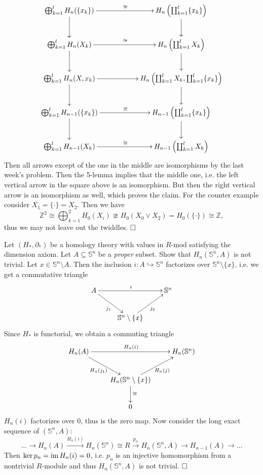 \documentclass[11pt]{book}
\numberwithin{dummy}{section}
\theoremstyle{nonumberbreak}
\newenvironment{sol}[1][]{\ifthenelse{\equal{#1}{}}{\solution}{\solution[#1]}\rm}{\endsolution}
\newenvironment{prob}[1][]{\ifthenelse{\equal{#1}{}}{\problem}{\problem[#1]}\rm}{\endproblem}
\newcommand{\Rmod}{\underline{R\textrm{-}\mathrm{mod}}}
\newcommand{\im}{\mathrm{im} \hspace{1.5pt}}
\newcommand{\Sph}{\mathbb{S}}
\newcommand{\la}{\longrightarrow}
\newcommand{\Z}{\mathbb{Z}}
\begin{document}
\begin{spacing}{1.4}
\begin{prob}
\begin{sol}
$$
\begin{xy}
\xymatrix{
\bigoplus_{k=1}^l H_n(\{x_k\}) \ar[rr]^{\cong} \ar[d] && H_n\left( \coprod_{k=1}^l \{x_k\}\right) \ar[d] \\
\bigoplus_{k=1}^l H_n(X_k) \ar[d] \ar[rr]^{\cong} && H_n\left( \coprod_{k=1}^l X_k\right) \ar[d] \\
\bigoplus_{k=1}^l H_n(X,x_k) \ar[d] \ar[rr] && H_n\left( \coprod_{k=1}^l X_k, \coprod_{k=1}^l \{x_k\}\right) \ar[d] \\
\bigoplus_{k=1}^l H_{n-1}(\{x_k\}) \ar[d] \ar[rr]^{\cong} && H_{n-1}\left( \coprod_{k=1}^l \{x_k\}\right) \ar[d] \\
\bigoplus_{k=1}^l H_{n-1}(X_k) \ar[rr]^{\cong} && H_{n-1}\left( \coprod_{k=1}^l X_k\right)
}
\end{xy}
$$
Then all arrows except of the one in the middle are isomorphisms by the last week's problem. Then the 5-lemma implies that the middle one, i.e. the left vertical arrow in the square above is an isomorphism. But then the right vertical arrow is an isomorphism as well, which proves the claim. For the counter example consider $X_1=\{\cdot\} = X_2$. Then we have 
$$\Z^2 \cong \bigoplus_{k=1}^2 H_0(X_i) \ncong H_0(X_0\vee X_2) = H_0(\{\cdot\}) \cong \Z,$$
thus we may not leave out the twiddles. $\hfill \Box$

\end{sol}


\end{prob}


\begin{prob} %
Let $(H_*, \partial_*)$ be a homology theory with values in $\Rmod$ satisfying the dimension axiom. Let $A \subseteq \Sph^n$ be a \textit{proper} subset. Show that $H_n(\Sph^n,A)$ is not trivial.
\begin{sol}
Let $x \in \Sph^n \setminus A$. Then the inclusion $i: A \hookrightarrow \Sph^n$ factorizes over $\Sph^{n} \setminus \{x\}$, i.e. we get a commutative triangle
$$
\begin{xy}
\xymatrix{
A \ar[rr]^{i} \ar[rd]_{j_1} && \Sph^n \\ & \Sph^n\setminus \{x\} \ar[ru]_{j_2} & 
}
\end{xy}
$$
Since $H_*$ is functorial, we obtain a commuting triangle
$$
\begin{xy}
\xymatrix{
H_n(A) \ar[rr]^{H_n(i)} \ar[rd]_{H_n(j_1)} && H_n(\Sph^n) \\ & H_n(\Sph^n\setminus \{x\}) \ar[d]^{\cong}\ar[ru]_{H_n(j)} & \\
& 0 &
}
\end{xy}
$$
$H_n(i)$ factorizes over $0$, thus is the zero map. Now consider the long exact sequence of $(\Sph^n, A)$:
$$\ldots \la H_n(A) \overset{H_n(i)}{\la} H_n(\Sph^n) \cong R \overset{p_n}{\la} H_n(\Sph^n,A) \la H_{n-1}(A) \la \ldots $$
Then $\ker p_n = \im H_n(i) = 0$, i.e. $p_n$ is an injective homomorphism from a nontrivial $R$-module and thus $H_n(\Sph^n,A)$ is not trivial. $\hfill \Box$


\end{sol}
\end{prob}
\end{spacing}
\end{document}

